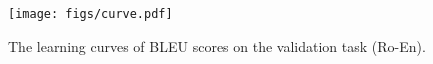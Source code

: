 \begin{figure}[htpb]
    \centering
    \texttt{[image: figs/curve.pdf]}
    \caption{The learning curves of BLEU scores on the validation task (Ro-En).}
    \label{fig:train curve}
    \vspace{-10pt}
\end{figure}

